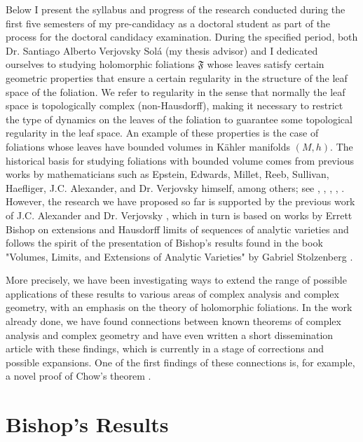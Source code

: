 \documentclass[12pt,twoside,a4paper]{report}
\begin{document}
\noindent Below I present the syllabus and progress of the research conducted during the first five semesters
of my pre-candidacy as a doctoral student as part of the process for the doctoral candidacy examination.
During the specified period, both Dr. Santiago Alberto Verjovsky Solá (my thesis advisor) and I dedicated ourselves to studying
holomorphic foliations $\mathfrak{F}$ whose leaves satisfy certain geometric properties that ensure a certain regularity in
the structure of the leaf space of the foliation. We refer to regularity in the sense that normally the
leaf space is topologically complex (non-Hausdorff), making it necessary to restrict the type of dynamics on the leaves
of the foliation to guarantee some topological regularity in the leaf space. An example of these properties is the case of foliations whose leaves have
bounded volumes in K\"ahler manifolds $(M,h)$.
The historical basis for studying foliations with bounded volume comes from previous works by mathematicians such as
Epstein, Edwards, Millet, Reeb, Sullivan, Haefliger, J.C. Alexander, and Dr. Verjovsky himself, among others; see \cite{EMS}, \cite{V-A}, \cite{E-V}, \cite{Epstein1}, \cite{Epstein2}.
However, the research we have proposed so far is supported by the previous work of J.C. Alexander and
Dr. Verjovsky \cite{A-V}, which in turn is based on works by Errett Bishop \cite{Bishop} on extensions and Hausdorff limits
of sequences of analytic varieties and follows the spirit of the presentation of Bishop's results found in the
book "Volumes, Limits, and Extensions of Analytic Varieties" by Gabriel Stolzenberg \cite{Stolzenberg}.

More precisely, we have been investigating ways to extend the range of possible applications of these results to
various areas of complex analysis and complex geometry, with an emphasis on the theory of holomorphic foliations. In the work
already done, we have found connections between known theorems of complex analysis and complex geometry and have even
written a short dissemination article with these findings, which is currently in a stage of corrections
and possible expansions. One of the first findings of these connections is, for example, a novel proof of Chow's theorem \cite{Chow}.

\section{Bishop's Results}
\end{document}
